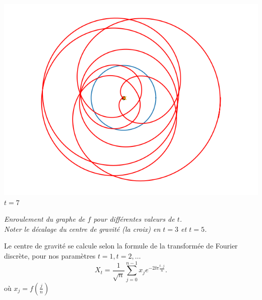 \documentclass[11pt,class=report,crop=false]{standalone}
\begin{document}
\begin{center}
\begin{minipage}{0.3\textwidth}
	\center \includegraphics[scale=\myscale,scale=0.33]{figures/fourier-9-7}
	$t = 7$ 
	\end{minipage}

\medskip

\nopagebreak

\begin{minipage}{0.8\textwidth}
\center\emph{Enroulement du graphe de $f$ pour différentes valeurs de $t$.\\  Noter le décalage du  centre de gravité (la croix) en $t=3$ et $t=5$.
}
\end{minipage}

\end{center}

Le centre de gravité se calcule selon la formule de la transformée de Fourier discrète, pour nos paramètres $t=1,t=2,\ldots$ 
$$X_t = \frac{1}{\sqrt n}\sum_{j=0}^{n-1} x_j e^{-2\ii\pi \frac{t \cdot j}{n}}.$$
où $x_j = f\left(\frac{j}{n}\right)$
\end{document}

